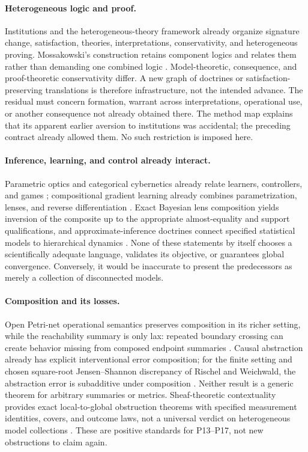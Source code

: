 \documentclass[11pt]{article}
\theoremstyle{definition}
\begin{document}
\paragraph{Heterogeneous logic and proof.}
Institutions and the heterogeneous-theory framework already organize signature change, satisfaction, theories, interpretations, conservativity, and heterogeneous proving. Mossakowski's construction retains component logics and relates them rather than demanding one combined logic \cite{Hets}. Model-theoretic, consequence, and proof-theoretic conservativity differ. A new graph of doctrines or satisfaction-preserving translations is therefore infrastructure, not the intended advance. The residual must concern formation, warrant across interpretations, operational use, or another consequence not already obtained there. The method map explains that its apparent earlier aversion to institutions was accidental; the preceding contract already allowed them. No such restriction is imposed here.

\paragraph{Inference, learning, and control already interact.}
Parametric optics and categorical cybernetics already relate learners, controllers, and games \cite{Cybernetics}; compositional gradient learning already combines parametrization, lenses, and reverse differentiation \cite{Gradient}. Exact Bayesian lens composition yields inversion of the composite up to the appropriate almost-equality and support qualifications, and approximate-inference doctrines connect specified statistical models to hierarchical dynamics \cite{SmitheI,SmitheII}. None of these statements by itself chooses a scientifically adequate language, validates its objective, or guarantees global convergence. Conversely, it would be inaccurate to present the predecessors as merely a collection of disconnected models.

\paragraph{Composition and its losses.}
Open Petri-net operational semantics preserves composition in its richer setting, while the reachability summary is only lax: repeated boundary crossing can create behavior missing from composed endpoint summaries \cite{Petri}. Causal abstraction already has explicit interventional error composition; for the finite setting and chosen square-root Jensen--Shannon discrepancy of Rischel and Weichwald, the abstraction error is subadditive under composition \cite{CausalError}. Neither result is a generic theorem for arbitrary summaries or metrics. Sheaf-theoretic contextuality provides exact local-to-global obstruction theorems with specified measurement identities, covers, and outcome laws, not a universal verdict on heterogeneous model collections \cite{Contextuality}. These are positive standards for P13--P17, not new obstructions to claim again.
\end{document}
